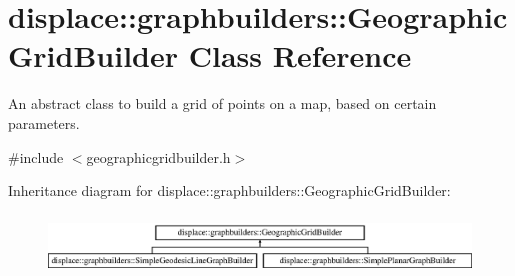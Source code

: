 \hypertarget{classdisplace_1_1graphbuilders_1_1_geographic_grid_builder}{}\section{displace\+::graphbuilders\+::Geographic\+Grid\+Builder Class Reference}
\label{classdisplace_1_1graphbuilders_1_1_geographic_grid_builder}


An abstract class to build a grid of points on a map, based on certain parameters.  




{\ttfamily \#include $<$geographicgridbuilder.\+h$>$}

Inheritance diagram for displace\+::graphbuilders\+::Geographic\+Grid\+Builder\+:\begin{figure}[H]
\begin{center}
\leavevmode
\includegraphics[height=1.618497cm]{d9/d7a/classdisplace_1_1graphbuilders_1_1_geographic_grid_builder}
\end{center}
\end{figure}
